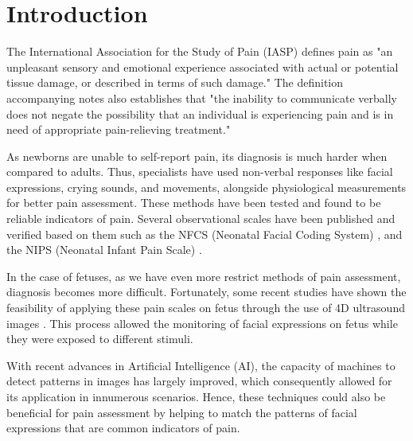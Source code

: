 \documentclass[msc]{ppgccufmg}
\begin{document}

\chapter{Introduction}

The International Association for the Study of Pain (IASP) defines pain as "an unpleasant sensory and emotional experience associated with actual or potential tissue damage, or described in terms of such damage." \citep{merskey1994classification} The definition accompanying notes also establishes that "the inability to communicate verbally does not negate the possibility that an individual is experiencing pain and is in need of appropriate pain-relieving treatment."

As newborns are unable to self-report pain, its diagnosis is much harder when compared to adults. Thus, specialists have used non-verbal responses like facial expressions, crying sounds, and movements, alongside physiological measurements for better pain assessment. These methods have been tested and found to be reliable indicators of pain. Several observational scales have been published and verified based on them such as the NFCS (Neonatal Facial Coding System) \citep{Grunau1998}, and the NIPS (Neonatal Infant Pain Scale) \citep{HudsonBarr2002}.

In the case of fetuses, as we have even more restrict methods of pain assessment, diagnosis becomes more difficult. Fortunately, some recent studies have shown the feasibility of applying these pain scales on fetus through the use of 4D ultrasound images \citep{bernardes2018feasibility}. This process allowed the monitoring of facial expressions on fetus while they were exposed to different stimuli.

With recent advances in Artificial Intelligence (AI), the capacity of machines to detect patterns in images has largely improved, which consequently allowed for its application in innumerous scenarios. Hence, these techniques could also be beneficial for pain assessment by helping to match the patterns of facial expressions that are common indicators of pain.
\end{document}
